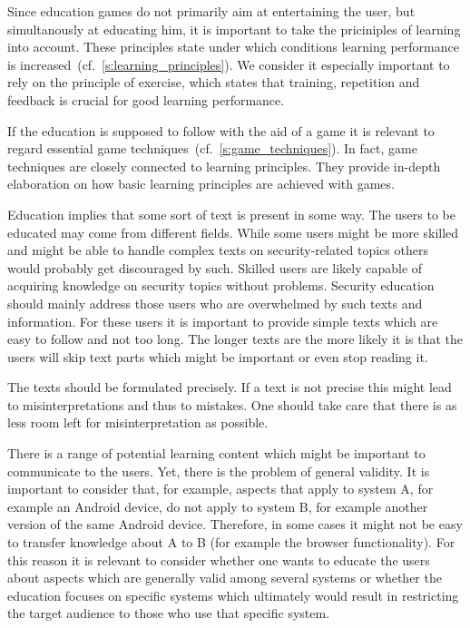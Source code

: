 \begin{description}[leftmargin=0cm]
	\item[Principles of Learning] Since education games do not primarily aim at entertaining the user, but simultanously at educating him, it is important to take the priciniples of learning into account.
These principles state under which conditions learning performance is increased~(cf.~\autoref{s:learning_principles}).
We consider it especially important to rely on the principle of exercise, which states that training, repetition and feedback is crucial for good learning performance.
	\item[Game Techniques]  If the education is supposed to follow with the aid of a game it is relevant to regard essential game techniques~(cf.~\autoref{s:game_techniques}).
In fact, game techniques are closely connected to learning principles.
They provide in-depth elaboration on how basic learning principles are achieved with games.
	\item[Simple and Short Text] Education implies that some sort of text is present in some way.
The users to be educated may come from different fields.
While some users might be more skilled and might be able to handle complex texts on security-related topics others would probably get discouraged by such.
Skilled users are likely capable of acquiring knowledge on security topics without problems.
Security education should mainly address those users who are overwhelmed by such texts and information.
For these users it is important to provide simple texts which are easy to follow and not too long.
The longer texts are the more likely it is that the users will skip text parts which might be important or even stop reading it.
\item[Precise Phrasing] The texts should be formulated precisely. 
If a text is not precise this might lead to misinterpretations and thus to mistakes. 
One should take care that there is as less room left for misinterpretation as possible.
\item[General Validity] There is a range of potential learning content which might be important to communicate to the users.
Yet, there is the problem of general validity.
It is important to consider that, for example, aspects that apply to system A, for example an Android device, do not apply to system B, for example another version of the same Android device.
Therefore, in some cases it might not be easy to transfer knowledge about A to B (for example the browser functionality).
For this reason it is relevant to consider whether one wants to educate the users about aspects which are generally valid among several systems or whether the education focuses on specific systems which ultimately would result in restricting the target audience to those who use that specific system.
\end{description}



